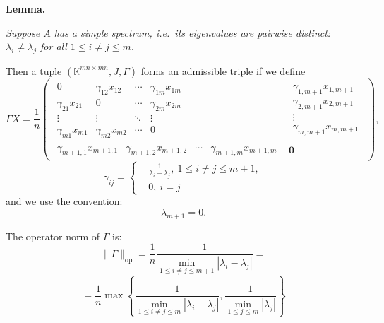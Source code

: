 \documentclass[a4paper]{jpconf}
\begin{document}
\textbf{Lemma.}
{\it
Suppose \( A \) has a simple spectrum,
    i.e.\ its eigenvalues are pairwise distinct:
    \( \lambda_i\neq\lambda_j \) for all \( 1\leq i{\neq}j \leq m \).

    Then a tuple \( (\mathbb{K}^{{mn}{\times}{mn}}, J, \Gamma) \)
        forms an admissible triple if we define
    \[
        \Gamma X = 
            \frac1n \left(\begin{array}{c|c}
            \begin{matrix}
                0               & \gamma_{12}x_{12} & \cdots & \gamma_{1m}x_{1m} \\
                \gamma_{21}x_{21}  & 0              & \cdots & \gamma_{2m}x_{2m} \\
                \vdots          & \vdots         & \ddots & \vdots & \ \\
                \gamma_{m1}x_{m1}  & \gamma_{m2}x_{m2} & \cdots & 0
            \end{matrix} &
            \begin{matrix}
                \gamma_{1,m+1}x_{1,m+1} \\
                \gamma_{2,m+1}x_{2,m+1} \\
                \vdots \\
                \gamma_{m,m+1}x_{m,m+1}
            \end{matrix} \\ \hline
            \begin{matrix}
                \gamma_{m{+}1,1}x_{m{+}1,1} &
                \gamma_{m{+}1,2}x_{m{+}1,2} &
                \cdots &
                \gamma_{m{+}1,m}x_{m{+}1,m}
            \end{matrix} &
            \mathbf{0}
        \end{array}\right),
    \]
    \[
        \gamma_{ij} = \left\{
            \begin{aligned}
                & \frac{1}{\lambda_i - \lambda_j},\ 1\leq i{\neq}j \leq m{+}1,\\
                & 0,\ i=j
            \end{aligned}
            \right.
    \]
    and we use the convention:
    \[
        \lambda_{m{+}1} = 0.
    \]

    The operator norm of \( \Gamma \) is:
    \[
        \|\Gamma\|_{\mathrm{op}} =
        \frac1n
        \frac{1}{\min_{1\leq i{\neq}j \leq m{+}1}|\lambda_i - \lambda_j|} =
        \]
    \[
        = \frac1n
         \max\left\{
         \frac{1}{
             \min\limits_{1\leq i{\neq}j \leq m }{|\lambda_i - \lambda_j|}},
         \frac{1}{
             \min\limits_{1\leq j \leq m}{|\lambda_j|}}
         \right\}
        \]
\/}
\end{document}
